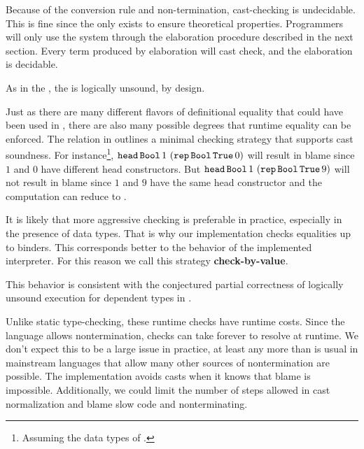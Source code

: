  
 
Because of the conversion rule and non-termination, cast-checking is undecidable.
This is fine since the \csys{} only exists to ensure theoretical properties. 
Programmers will only use the system through the elaboration procedure described in the next section.
Every term produced by elaboration will cast check, and the elaboration is decidable. %
 
As in the \slang{}, the \clang{} is logically unsound, by design.
 
Just as there are many different flavors of definitional equality that could have been used in , there are also many possible degrees that runtime equality can be enforced.
The \Blame{} relation in  outlines a minimal checking strategy that supports cast soundness.
For instance\footnote{
  Assuming the data types of .
}, $\mathtt{head}\,\mathtt{Bool}{}\,1\,\left(\mathtt{rep}\,\mathtt{Bool}{}\,\mathtt{True}{}\,0\right)$ will result in blame since $1$ and $0$ have different head constructors.
But $\mathtt{head}\,\mathtt{Bool}{}\,1\,\left(\mathtt{rep}\,\mathtt{Bool}{}\,\mathtt{True}{}\,9\right)$ will not result in blame since $1$ and $9$ have the same head constructor and the computation can reduce to \True{}.
 
It is likely that more aggressive checking is preferable in practice, especially in the presence of data types.
That is why our implementation checks equalities up to binders. 
This corresponds better to the \cbv{} behavior of the implemented interpreter.
For this reason we call this strategy \textbf{check-by-value}.
 
This behavior is consistent with the conjectured partial correctness of logically unsound \cbv{} execution for dependent types in \cite{jia2010dependent}.
 
 
Unlike static type-checking, these runtime checks have runtime costs.
Since the language allows nontermination, checks can take forever to resolve at runtime.
We don't expect this to be a large issue in practice, at least any more than is usual in mainstream languages that allow many other sources of nontermination are possible.
The implementation avoids casts when it knows that blame is impossible.
Additionally, we could limit the number of steps allowed in cast normalization and blame slow code and nonterminating.